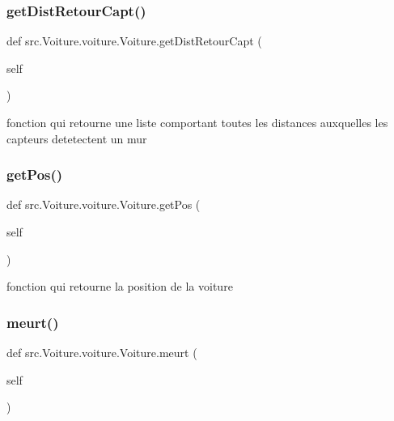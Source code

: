 \subsubsection{\texorpdfstring{get\+Dist\+Retour\+Capt()}{getDistRetourCapt()}}
{\footnotesize\ttfamily def src.\+Voiture.\+voiture.\+Voiture.\+get\+Dist\+Retour\+Capt (\begin{DoxyParamCaption}\item[{}]{self }\end{DoxyParamCaption})}



fonction qui retourne une liste comportant toutes les distances auxquelles les capteurs detetectent un mur 

\mbox{\label{classsrc_1_1_voiture_1_1voiture_1_1_voiture_adf2c8f1fe4e59541e49ad034ebb15c99}} 
\subsubsection{\texorpdfstring{get\+Pos()}{getPos()}}
{\footnotesize\ttfamily def src.\+Voiture.\+voiture.\+Voiture.\+get\+Pos (\begin{DoxyParamCaption}\item[{}]{self }\end{DoxyParamCaption})}



fonction qui retourne la position de la voiture 

\mbox{\label{classsrc_1_1_voiture_1_1voiture_1_1_voiture_a67f1af78ea71b0d6ccfcfe272a6be4c0}} 
\subsubsection{\texorpdfstring{meurt()}{meurt()}}
{\footnotesize\ttfamily def src.\+Voiture.\+voiture.\+Voiture.\+meurt (\begin{DoxyParamCaption}\item[{}]{self }\end{DoxyParamCaption})}

